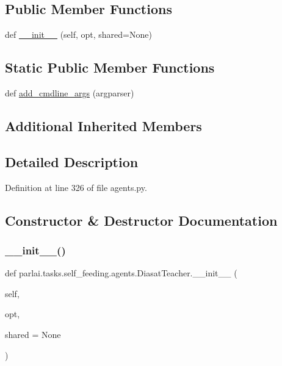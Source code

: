 \subsection*{Public Member Functions}
\begin{DoxyCompactItemize}
\item 
def \hyperlink{classparlai_1_1tasks_1_1self__feeding_1_1agents_1_1DiasatTeacher_aeffe6f4b3c3bd2800c6745da4ab95015}{\+\_\+\+\_\+init\+\_\+\+\_\+} (self, opt, shared=None)
\end{DoxyCompactItemize}
\subsection*{Static Public Member Functions}
\begin{DoxyCompactItemize}
\item 
def \hyperlink{classparlai_1_1tasks_1_1self__feeding_1_1agents_1_1DiasatTeacher_a28eadfed974fe247525076406032e7ec}{add\+\_\+cmdline\+\_\+args} (argparser)
\end{DoxyCompactItemize}
\subsection*{Additional Inherited Members}


\subsection{Detailed Description}


Definition at line 326 of file agents.\+py.



\subsection{Constructor \& Destructor Documentation}
\mbox{\label{classparlai_1_1tasks_1_1self__feeding_1_1agents_1_1DiasatTeacher_aeffe6f4b3c3bd2800c6745da4ab95015}} 
\subsubsection{\texorpdfstring{\+\_\+\+\_\+init\+\_\+\+\_\+()}{\_\_init\_\_()}}
{\footnotesize\ttfamily def parlai.\+tasks.\+self\+\_\+feeding.\+agents.\+Diasat\+Teacher.\+\_\+\+\_\+init\+\_\+\+\_\+ (\begin{DoxyParamCaption}\item[{}]{self,  }\item[{}]{opt,  }\item[{}]{shared = {\ttfamily None} }\end{DoxyParamCaption})}



